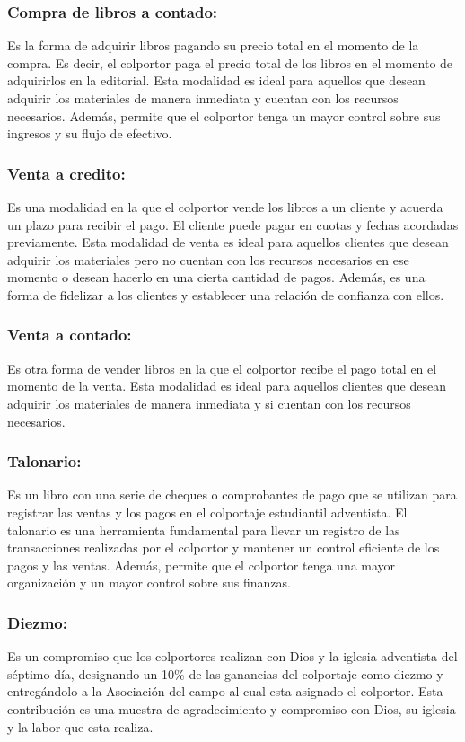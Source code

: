\documentclass[runningheads]{llncs}
\begin{document}
\subsubsection{Compra de libros a contado: }Es la forma de adquirir libros pagando su precio total en el momento de la compra. Es decir, el colportor paga el precio total de los libros en el momento de adquirirlos en la editorial. Esta modalidad es ideal para aquellos que desean adquirir los materiales de manera inmediata y cuentan con los recursos necesarios. Además, permite que el colportor tenga un mayor control sobre sus ingresos y su flujo de efectivo.

\subsubsection{Venta a credito: }Es una modalidad en la que el colportor vende los libros a un cliente y acuerda un plazo para recibir el pago. El cliente puede pagar en cuotas y fechas acordadas previamente. Esta modalidad de venta es ideal para aquellos clientes que desean adquirir los materiales pero no cuentan con los recursos necesarios en ese momento o desean hacerlo en una cierta cantidad de pagos. Además, es una forma de fidelizar a los clientes y establecer una relación de confianza con ellos.

\subsubsection{Venta a contado: }Es otra forma de vender libros en la que el colportor recibe el pago total en el momento de la venta. Esta modalidad es ideal para aquellos clientes que desean adquirir los materiales de manera inmediata y si cuentan con los recursos necesarios. 

\subsubsection{Talonario: }Es un libro con una serie de cheques o comprobantes de pago que se utilizan para registrar las ventas y los pagos en el colportaje estudiantil adventista. El talonario es una herramienta fundamental para llevar un registro de las transacciones realizadas por el colportor y mantener un control eficiente de los pagos y las ventas. Además, permite que el colportor tenga una mayor organización y un mayor control sobre sus finanzas.

\subsubsection{Diezmo: }Es un compromiso que los colportores realizan con Dios y la iglesia adventista del séptimo día, designando un 10\% de las ganancias del colportaje como diezmo y entregándolo a la Asociación del campo al cual esta asignado el colportor. Esta contribución es una muestra de agradecimiento y compromiso con Dios, su iglesia y la labor que esta realiza. 
\end{document}
